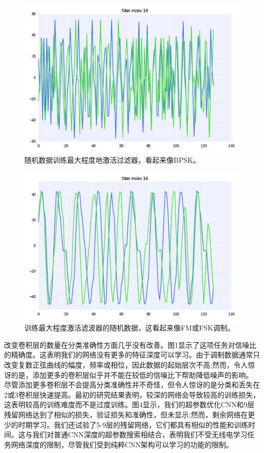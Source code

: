 \begin{figure}[!h]
	\centering
	\includegraphics[scale=1]{figures/chapter_5/fig9_b}
	\caption{随机数据训练最大程度地激活过滤器，看起来像BPSK。}
\end{figure}

\begin{figure}[!h]
	\centering
	\includegraphics[scale=1]{figures/chapter_5/fig10_b}
	\caption{训练最大程度激活滤波器的随机数据，这看起来像FM或FSK调制。}
\end{figure}
改变卷积层的数量在分类准确性方面几乎没有改善。图1显示了这项任务对信噪比的精确度。这表明我们的网络没有更多的特征深度可以学习。由于调制数据通常只改变复数正弦曲线的幅度，频率或相位，因此数据的起始层次不高;然而，令人惊讶的是，添加更多的卷积层似乎并不能在较低的信噪比下帮助降低噪声的影响。
尽管添加更多卷积层不会提高分类准确性并不奇怪，但令人惊讶的是分类和丢失在2或3卷积层快速提高。最初的研究结果表明，较深的网络会导致较高的训练损失，这表明较高的训练难度而不是过度训练。图4显示，我们的超参数优化CNN和9层残留网络达到了相似的损失，验证损失和准确性，但未显示;然而，剩余网络在更少的时期学习。我们还试验了5-9层的残留网络，它们都具有相似的性能和训练时间。这与我们对普通CNN深度的超参数搜索相结合，表明我们不受无线电学习任务网络深度的限制，尽管我们受到纯粹CNN架构可以学习的功能的限制。

